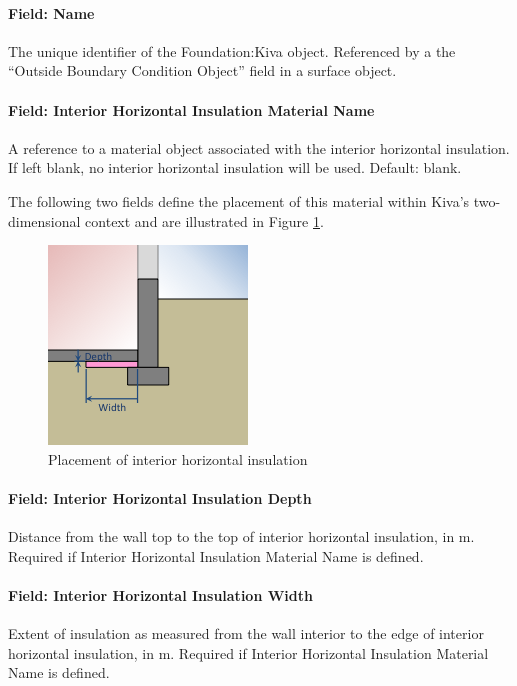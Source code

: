 \paragraph{Field: Name}

The unique identifier of the Foundation:Kiva object. Referenced by a the
``Outside Boundary Condition Object'' field in a surface object.

\paragraph{Field: Interior Horizontal Insulation Material
Name}

A reference to a material object associated with the interior horizontal
insulation. If left blank, no interior horizontal insulation will be
used. Default: blank.

The following two fields define the placement of this material within
Kiva's two-dimensional context and are illustrated in Figure
\ref{fig:ihi}.

\begin{figure}
\centering
\includegraphics{media/kiva-2d-ihi.png}
\caption{Placement of interior horizontal insulation\label{fig:ihi}}
\end{figure}

\paragraph{Field: Interior Horizontal Insulation
Depth}

Distance from the wall top to the top of interior horizontal insulation,
in m. Required if Interior Horizontal Insulation Material Name is
defined.

\paragraph{Field: Interior Horizontal Insulation
Width}

Extent of insulation as measured from the wall interior to the edge of
interior horizontal insulation, in m. Required if Interior Horizontal
Insulation Material Name is defined.

